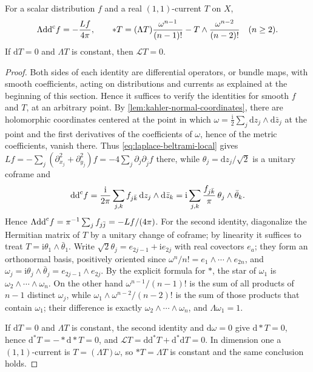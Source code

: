 \begin{lemma}\label{lem:kahler-trace-star}
For a scalar distribution $f$ and a real $(1,1)$-current $T$ on $X$,
\begin{equation}\label{eq:kahler-trace-star}
 \Lambda\mathrm{dd}^{\mathrm{c}} f=-\frac{Lf}{4\pi},\qquad
 *T=(\Lambda T)\frac{\omega^{n-1}}{(n-1)!}
          -T\wedge\frac{\omega^{n-2}}{(n-2)!}\quad(n\geq2).
\end{equation}
If $\mathrm dT=0$ and $\Lambda T$ is constant, then $\mathcal LT=0$.
\end{lemma}
\begin{proof}
Both sides of each identity are differential operators, or bundle maps, with smooth coefficients, acting on distributions and currents as explained at the beginning of this section. Hence it suffices to verify the identities for smooth $f$ and $T$, at an arbitrary point. By \cref{lem:kahler-normal-coordinates}, there are holomorphic coordinates centered at the point in which $\omega=\frac{\mathrm i}{2}\sum_j\mathrm dz_j\wedge\mathrm d\bar z_j$ at the point and the first derivatives of the coefficients of $\omega$, hence of the metric coefficients, vanish there. Thus \eqref{eq:laplace-beltrami-local} gives $Lf=-\sum_j(\partial_{x_j}^2+\partial_{y_j}^2)f=-4\sum_j\partial_j\partial_{\bar j}f$ there, while $\theta_j=\mathrm dz_j/\sqrt2$ is a unitary coframe and
\[
 \mathrm{dd}^{\mathrm{c}} f=\frac{\mathrm i}{2\pi}\sum_{j,k}f_{j\bar k}\,\mathrm dz_j\wedge\mathrm d\bar z_k
       =\mathrm i\sum_{j,k}\frac{f_{j\bar k}}{\pi}\,\theta_j\wedge\bar\theta_k .
\]
Hence $\Lambda\mathrm{dd}^{\mathrm{c}} f=\pi^{-1}\sum_jf_{j\bar j}=-Lf/(4\pi)$. For the second identity, diagonalize the Hermitian matrix of $T$ by a unitary change of coframe; by linearity it suffices to treat $T=\mathrm i\theta_1\wedge\bar\theta_1$. Write $\sqrt2\theta_j=e_{2j-1}+\mathrm ie_{2j}$ with real covectors $e_a$; they form an orthonormal basis, positively oriented since $\omega^n/n!=e_1\wedge\cdots\wedge e_{2n}$, and $\omega_j=\mathrm i\theta_j\wedge\bar\theta_j=e_{2j-1}\wedge e_{2j}$. By the explicit formula for $*$, the star of $\omega_1$ is $\omega_2\wedge\cdots\wedge\omega_n$. On the other hand $\omega^{n-1}/(n-1)!$ is the sum of all products of $n-1$ distinct $\omega_j$, while $\omega_1\wedge\omega^{n-2}/(n-2)!$ is the sum of those products that contain $\omega_1$; their difference is exactly $\omega_2\wedge\cdots\wedge\omega_n$, and $\Lambda\omega_1=1$.

If $\mathrm dT=0$ and $\Lambda T$ is constant, the second identity and $\mathrm d\omega=0$ give $\mathrm d*T=0$, hence $\mathrm d^*T=-*\mathrm d*T=0$, and $\mathcal LT=\mathrm d\mathrm d^*T+\mathrm d^*\mathrm dT=0$. In dimension one a $(1,1)$-current is $T=(\Lambda T)\omega$, so $*T=\Lambda T$ is constant and the same conclusion holds.
\end{proof}

